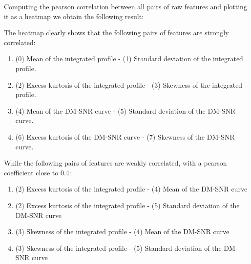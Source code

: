 \documentclass[12pt,a4paper]{article}
\begin{document}
Computing the pearson correlation between all pairs of raw features and plotting it as a heatmap we obtain the following result:
\begin{figure}[H]
    \begin{center}
    \end{center}
\end{figure}
The heatmap clearly shows that the following pairs of features are strongly correlated:
\begin{enumerate}
    \item (0) Mean of the integrated profile - (1) Standard deviation of the integrated profile.
    \item (2) Excess kurtosis of the integrated profile - (3) Skewness of the integrated profile.
    \item (4) Mean of the DM-SNR curve - (5) Standard deviation of the DM-SNR curve.
    \item (6) Excess kurtosis of the DM-SNR curve - (7) Skewness of the DM-SNR curve.
\end{enumerate}

While the following pairs of features are weakly correlated, with a pearson coefficient close to 0.4:
\begin{enumerate}
    \item (2) Excess kurtosis of the integrated profile - (4) Mean of the DM-SNR curve
    \item (2) Excess kurtosis of the integrated profile - (5) Standard deviation of the DM-SNR curve
    \item (3) Skewness of the integrated profile - (4) Mean of the DM-SNR curve
    \item (3) Skewness of the integrated profile - (5) Standard deviation of the DM-SNR curve
\end{enumerate}
\end{document}
